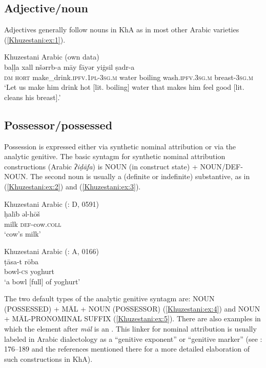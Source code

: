 \documentclass[output=paper,colorlinks,citecolor=brown,draftmode]{langscibook}
\begin{document}
\subsection{Adjective/noun}\label{Khuzestani:ss:2.1}

Adjectives generally follow nouns in KhA as in most other Arabic varieties (\ref{Khuzestani:ex:1}). 

\ea\label{Khuzestani:ex:1}
Khuzestani Arabic (own data) \\
\gll baḷḷa xall nšərrb-a māy fāyər yiġsil ṣadr-a \\
\textsc{dm} \textsc{hort} make\_drink\textsc{.ipfv.1pl-3sg.m} water boiling wash\textsc{.ipfv.3sg.m} breast\textsc{-3sg.m} \\
\glt `Let us make him drink hot [lit. boiling] water that makes him feel good [lit. cleans his breast].' 
\z

\subsection{Possessor/possessed}\label{Khuzestani:ss:2.2}

Possession is expressed either via synthetic nominal attribution or via the analytic genitive.
The basic syntagm for synthetic nominal attribution constructions (Arabic \textit{ʔiḍāfa}) is NOUN (in construct state) + NOUN/DEF-NOUN. The second noun is usually a (definite or indefinite) substantive, as in (\ref{Khuzestani:ex:2}) and (\ref{Khuzestani:ex:3}).

\ea\label{Khuzestani:ex:2}
Khuzestani Arabic (\citealt{leitnerArabic2021}: D, 0591) \\
\gll ḥalīb əl-hōš \\
milk \textsc{def-}cow\textsc{.coll} \\
\glt `cow's milk' 
\z

\ea\label{Khuzestani:ex:3}
Khuzestani Arabic (\citealt{leitnerArabic2021}: A, 0166) \\
\gll ṭāsa-t rōba \\
bowl\textsc{-cs} yoghurt \\
\glt `a bowl [full] of yoghurt' 
\z

\begin{sloppypar}
The two default types of the analytic genitive syntagm are: NOUN (POSSESSED) + MĀL + NOUN (POSSESSOR) (\ref{Khuzestani:ex:4}) and NOUN + MĀL-PRONOMINAL SUFFIX (\ref{Khuzestani:ex:5}). There are also examples in which the element after \textit{māl} is an . This linker for nominal attribution is usually labeled in Arabic dialectology as a ``genitive exponent'' or ``genitive marker'' (see \citealt{leitnerGrammar2022}: 176--189 and the references mentioned there for a more detailed elaboration of such constructions in KhA). 
\end{sloppypar}
\end{document}
